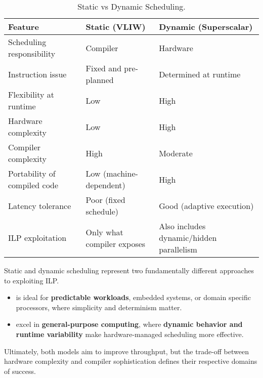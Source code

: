 \highspace
\begin{table}[!htp]
    \centering
    \begin{adjustbox}{width={\textwidth},totalheight={\textheight},keepaspectratio}
        \begin{tabular}{@{} l | l | l @{}}
            \toprule
            \textbf{Feature}                & \textbf{Static (VLIW)}        & \textbf{Dynamic (Superscalar)}            \\
            \midrule
            Scheduling responsibility       & Compiler                      & Hardware                                  \\ [.5em]
            Instruction issue               & Fixed and pre-planned         & Determined at runtime                     \\ [.5em]
            Flexibility at runtime          & Low                           & High                                      \\ [.5em]
            Hardware complexity             & Low                           & High                                      \\ [.5em]
            Compiler complexity             & High                          & Moderate                                  \\ [.5em]
            Portability of compiled code    & Low (machine-dependent)       & High                                      \\ [.5em]
            Latency tolerance               & Poor (fixed schedule)         & Good (adaptive execution)                 \\ [.5em]
            ILP exploitation                & Only what compiler exposes    & Also includes dynamic/hidden parallelism  \\
            \bottomrule
        \end{tabular}
    \end{adjustbox}
    \caption{Static vs Dynamic Scheduling.}
\end{table}

\newpage

\noindent
Static and dynamic scheduling represent two fundamentally different approaches to exploiting ILP.
\begin{itemize}
    \item {} is ideal for \textbf{predictable workloads}, embedded systems, or domain specific processors, where simplicity and determinism matter.
    \item {} excel in \textbf{general-purpose computing}, where \textbf{dynamic behavior and runtime variability} make hardware-managed scheduling more effective.
\end{itemize}
Ultimately, both models aim to improve throughput, but the trade-off between hardware complexity and compiler sophistication defines their respective domains of success.